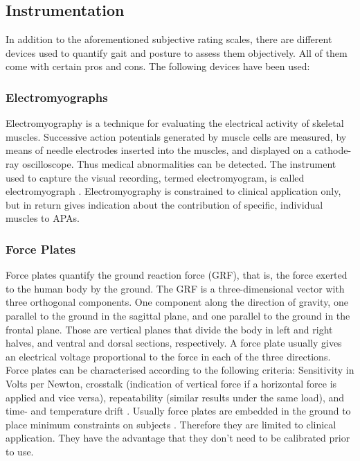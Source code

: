 \subsection{Instrumentation}

In addition to the aforementioned subjective rating scales, there are different devices used to quantify gait and posture to assess them objectively. All of them come with certain pros and cons. The following devices have been used:

\subsubsection{Electromyographs} Electromyography is a technique for evaluating the electrical activity of skeletal muscles. Successive action potentials generated by muscle cells are measured, by means of needle electrodes inserted into the muscles, and displayed on a cathode-ray oscilloscope. Thus medical abnormalities can be detected. The instrument used to capture the visual recording, termed electromyogram, is called electromyograph \cite{encyclopedia_britannica_electromyography_2014}. Electromyography is constrained to clinical application only, but in return gives indication about the contribution of specific, individual muscles to APAs.

\subsubsection{Force Plates} Force plates quantify the ground reaction force (GRF), that is, the force exerted to the human body by the ground. The GRF is a three-dimensional vector with three orthogonal components. One component along the direction of gravity, one parallel to the ground in the sagittal plane, and one parallel to the ground in the frontal plane. Those are vertical planes that divide the body in left and right halves, and ventral and dorsal sections, respectively. A force plate usually gives an electrical voltage proportional to the force in each of the three directions. Force plates can be characterised according to the following criteria: Sensitivity in Volts per Newton, crosstalk (indication of vertical force if a horizontal force is applied and vice versa), repeatability (similar results under the same load), and time- and temperature drift \cite{griffiths_principles_2006}. Usually force plates are embedded in the ground to place minimum constraints on subjects \cite{mancini_trunk_2011}. Therefore they are limited to clinical application. They have the advantage that they don't need to be calibrated prior to use. 

